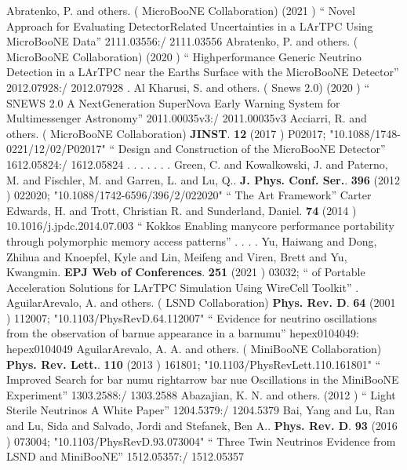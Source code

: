 \documentclass{article}
\begin{document}
\begin{thebibliography}{99}
  Abratenko, P. and others. ( MicroBooNE Collaboration) (2021 ) `` Novel Approach for Evaluating DetectorRelated Uncertainties in a LArTPC Using MicroBooNE Data'' 2111.03556:/ 2111.03556
  Abratenko, P. and others. ( MicroBooNE Collaboration) (2020 ) `` Highperformance Generic Neutrino Detection in a LArTPC near the Earths Surface with the MicroBooNE Detector'' 2012.07928:/ 2012.07928
 . 
  Al Kharusi, S. and others. ( Snews 2.0) (2020 ) `` SNEWS 2.0 A NextGeneration SuperNova Early Warning System for Multimessenger Astronomy'' 2011.00035v3:/ 2011.00035v3
  Acciarri, R. and others. ( MicroBooNE Collaboration) {\bf  JINST}. {\bf  12} (2017 )  P02017;  "10.1088/1748-0221/12/02/P02017" `` Design and Construction of the MicroBooNE Detector'' 1612.05824:/ 1612.05824
 . 
 . 
 . 
 . 
 . 
 . 
 . 
  Green, C. and Kowalkowski, J. and Paterno, M. and Fischler, M. and Garren, L. and Lu, Q.. {\bf  J. Phys. Conf. Ser.}. {\bf  396} (2012 )  022020;  "10.1088/1742-6596/396/2/022020" `` The Art Framework''
  Carter Edwards, H. and Trott, Christian R. and Sunderland, Daniel. {\bf  74} (2014 )  {10.1016/j.jpdc.2014.07.003} `` Kokkos Enabling manycore performance portability through polymorphic memory access patterns''
 . 
 . 
 . 
 . 
 Yu, Haiwang and Dong, Zhihua and Knoepfel, Kyle and Lin, Meifeng and Viren, Brett and Yu, Kwangmin. {\bf EPJ Web of Conferences}. {\bf 251} (2021 ) 03032; `` of Portable Acceleration Solutions for LArTPC Simulation Using WireCell Toolkit''
 . 
  AguilarArevalo, A. and others. ( LSND Collaboration) {\bf  Phys. Rev. D}. {\bf  64} (2001 )  112007;  "10.1103/PhysRevD.64.112007" `` Evidence for neutrino oscillations from the observation of barnue appearance in a barnumu'' hepex0104049: hepex0104049
  AguilarArevalo, A. A. and others. ( MiniBooNE Collaboration) {\bf  Phys. Rev. Lett.}. {\bf  110} (2013 )  161801;  "10.1103/PhysRevLett.110.161801" `` Improved Search for bar numu rightarrow bar nue Oscillations in the MiniBooNE Experiment'' 1303.2588:/ 1303.2588
  Abazajian, K. N. and others. (2012 ) `` Light Sterile Neutrinos A White Paper'' 1204.5379:/ 1204.5379
  Bai, Yang and Lu, Ran and Lu, Sida and Salvado, Jordi and Stefanek, Ben A.. {\bf  Phys. Rev. D}. {\bf  93} (2016 )  073004;  "10.1103/PhysRevD.93.073004" `` Three Twin Neutrinos Evidence from LSND and MiniBooNE'' 1512.05357:/ 1512.05357

\end{thebibliography}
\end{document}
